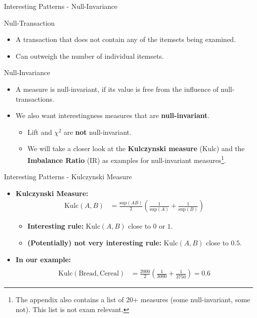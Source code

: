 \begin{frame}{Interesting Patterns - Null-Invariance}
	\begin{block}{Null-Transaction}
		\begin{itemize}
			\item A transaction that does not contain any of the itemsets being examined.
			\item Can outweigh the number of individual itemsets.
		\end{itemize}
	\end{block}

	\begin{block}{Null-Invariance}
		\begin{itemize}
			\item A measure is null-invariant, if its value is free from the influence of
			      null-transactions.
		\end{itemize}
	\end{block}


	\begin{itemize}
		\item We also want interestingness measures that are \textbf{null-invariant}.
		      \begin{itemize}
			      \item Lift and $\chi^2$ are \textbf{not} null-invariant.
			      \item We will take a closer look at the \textbf{Kulczynski measure} (Kulc) and the \textbf{Imbalance Ratio} (IR) as examples for null-invariant measures\footnote{The appendix also contains a list of 20+ measures (some null-invariant, some not). This list is not exam relevant.}.
		      \end{itemize}
	\end{itemize}
\end{frame}

\begin{frame}{Interesting Patterns - Kulczynski Measure}
	\begin{itemize}
		\item \textbf{Kulczynski Measure:}
		      \begin{align*}
			      \text{Kulc}(A,B) & = \frac{\text{sup}(AB)}{2}(\frac{1}{\text{sup}(A)} + \frac{1}{\text{sup}(B)})
		      \end{align*}
		      \begin{itemize}
			      \item \textbf{Interesting rule:} $\text{Kulc}(A,B)$ close to $0$ or $1$.
			      \item \textbf{(Potentially) not very interesting rule:} $\text{Kulc}(A,B)$ close to $0.5$.
		      \end{itemize}
		\item \textbf{In our example:} \\
		      \begin{align*}                       \\
			      \text{Kulc}(\text{Bread},\text{Cereal}) & = \frac{2000}{2}(\frac{1}{3000} + \frac{1}{3750}) = 0.6
		      \end{align*}
	\end{itemize}
\end{frame}

